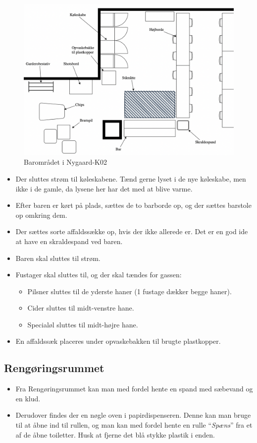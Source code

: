 \begin{figure}[H]
	\centering
	\includegraphics[width=\linewidth]{billeder/baromraadet_w_labels.png}
	\caption{Barområdet i Nygaard-K02}
	\label{fig:baromraadet}
\end{figure}

\begin{itemize}
	\item Der sluttes strøm til køleskabene. Tænd gerne lyset i de nye køleskabe, men ikke i de gamle, 
	da lysene her har det med at blive varme.
	\item Efter baren er kørt på plads, sættes de to barborde op, og der sættes barstole op omkring dem.
	\item Der sættes sorte affaldssække op, hvis der ikke allerede er. 
		Det er en god ide at have en skraldespand ved baren.
	\item Baren skal sluttes til strøm.
	\item Fustager skal sluttes til, og der skal tændes for gassen:
	\begin{itemize}
		\item Pilsner sluttes til de yderste haner (1 fustage dækker begge
		haner).
		\item Cider sluttes til midt-venstre hane.
		\item Specialøl sluttes til midt-højre hane.
	\end{itemize}
	\item En affaldssæk placeres under opvaskebakken til brugte plastkopper.
\end{itemize}

\subsection{Rengøringsrummet}
\label{sec:pre:rengøring}
\begin{itemize}
	\item Fra Rengøringsrummet kan man med fordel hente en spand med sæbevand og en klud.
	\item Derudover findes der en nøgle oven i papirdispenseren. Denne kan man bruge til 
	at åbne ind til rullen, og man kan med fordel hente en rulle ``\textit{Spæns}'' 
	fra et af de åbne toiletter. Husk at fjerne det blå stykke plastik i enden.
\end{itemize}